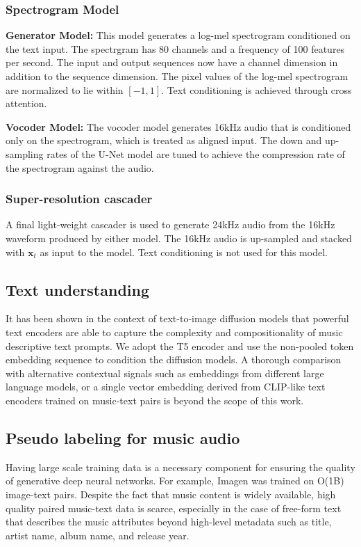 \subsubsection{Spectrogram Model}

\textbf{Generator Model:} This model generates a log-mel spectrogram conditioned on the text input. The spectrgram has 80 channels and a frequency of 100 features per second. The input and output sequences now have a channel dimension in addition to the sequence dimension. The pixel values of the log-mel spectrogram are normalized to lie within $[-1, 1]$. Text conditioning is achieved through cross attention.

\textbf{Vocoder Model:} The vocoder model generates 16kHz audio that is conditioned only on the spectrogram, which is treated as aligned input. The down and up-sampling rates of the U-Net model are tuned to achieve the compression rate of the spectrogram against the audio.

\subsubsection{Super-resolution cascader}

A final light-weight cascader is used to generate 24kHz audio from the 16kHz waveform produced by either model. The 16kHz audio is up-sampled and stacked with $\mathbf{x}_t$ as input to the model. Text conditioning is not used for this model.

\subsection{Text understanding}

It has been shown in the context of text-to-image diffusion models \cite{saharia2022photorealistic,rombach2021highresolution} that powerful text encoders are able to capture the complexity and compositionality of music descriptive text prompts. We adopt the T5 encoder \cite{raffel2020exploring} and use the non-pooled token embedding sequence to condition the diffusion models. A thorough comparison with alternative contextual signals such as embeddings from different large language models, or a single vector embedding derived from CLIP-like \cite{radford2021learning} text encoders trained on music-text pairs \cite{mulan2022,ilaria-contrastive-audio} is beyond the scope of this work.

\subsection{Pseudo labeling for music audio}
Having large scale training data is a necessary component for ensuring the quality of generative deep neural networks. For example, Imagen \cite{saharia2022photorealistic} was trained on O(1B) image-text pairs.
Despite the fact that music content is widely available, high quality paired music-text data is scarce, especially in the case of free-form text that describes the music attributes beyond high-level metadata such as title, artist name, album name, and release year.

